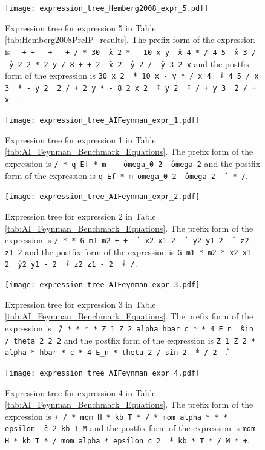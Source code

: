 \documentclass[12pt]{iopart}
\begin{document}
\begin{figure}
    \centering
    \texttt{[image: expression\_tree\_Hemberg2008\_expr\_5.pdf]}
    \caption{Expression tree for expression 5 in Table \ref{tab:Hemberg2008PreIP_results}. The prefix form of the expression is \texttt{- + + - + - + / * 30 \^\ x 2 * - 10 x y \^\ x 4 * / 4 5 \^\ x 3 / \^\ y 2 2 * 2 y / 8 + + 2 \^\ x 2 \^\ y 2 / \^\ y 3 2 x} and the postfix form of the expression is \texttt{30 x 2 \^\ * 10 x - y * / x 4 \^\ + 4 5 / x 3 \^\ * - y 2 \^\ 2 / + 2 y * - 8 2 x 2 \^\ + y 2 \^\ + / + y 3 \^\ 2 / + x -}. } 
    \label{fig:expression_tree_Hemberg2008_expr_5}
\end{figure}

\begin{figure}
    \centering
    \texttt{[image: expression\_tree\_AIFeynman\_expr\_1.pdf]}
    \caption{Expression tree for expression 1 in Table \ref{tab:AI_Feynman_Benchmark_Equations}. The prefix form of the expression is \texttt{/ * q Ef * m - \^\ omega\_0 2 \^\ omega 2} and the postfix form of the expression is \texttt{q Ef * m omega\_0 2 \^\ omega 2 \^\ - *  /}. }
    \label{fig:expression_tree_AIFeynman_expr_1}
\end{figure}

\begin{figure}
    \centering
    \texttt{[image: expression\_tree\_AIFeynman\_expr\_2.pdf]}
    \caption{Expression tree for expression 2 in Table \ref{tab:AI_Feynman_Benchmark_Equations}. The prefix form of the expression is \texttt{/ * * G m1 m2 + + \^\ - x2 x1 2 \^\ - y2 y1 2 \^\ - z2 z1 2} and the postfix form of the expression is \texttt{G m1 * m2 * x2 x1 - 2 \^\ y2 y1 - 2 \^\ + z2 z1 - 2 \^\ +  /}. } 
    \label{fig:expression_tree_AIFeynman_expr_2}
\end{figure}

\begin{figure}
    \centering
    \texttt{[image: expression\_tree\_AIFeynman\_expr\_3.pdf]}
    \caption{Expression tree for expression 3 in Table \ref{tab:AI_Feynman_Benchmark_Equations}. The prefix form of the expression is \texttt{\^\ / * * * * Z\_1 Z\_2 alpha hbar c * * 4 E\_n \^\ sin / theta 2 2 2} and the postfix form of the expression is \texttt{Z\_1 Z\_2 * alpha * hbar * c * 4 E\_n * theta 2 / sin 2 \^\ * / 2 \^\ }. } 
    \label{fig:expression_tree_AIFeynman_expr_3}
\end{figure}

\begin{figure}
    \centering
    \texttt{[image: expression\_tree\_AIFeynman\_expr\_4.pdf]}
    \caption{Expression tree for expression 4 in Table \ref{tab:AI_Feynman_Benchmark_Equations}.  The prefix form of the expression is \texttt{+ / * mom H * kb T * / * mom alpha * * * epsilon \^\ c 2 kb T M} and the postfix form of the expression is \texttt{mom H * kb T * / mom alpha * epsilon c 2 \^\ * kb * T * / M * +}. } 
    \label{fig:expression_tree_AIFeynman_expr_4}
\end{figure}
\end{document}
